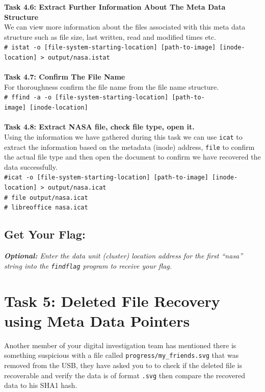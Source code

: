 \documentclass[a4paper,11pt]{article}
\begin{document}
{\noindent
\textbf{Task 4.6: Extract Further Information About The Meta Data Structure}\\
We can view more information about the files associated with this meta data structure such as file size, last written, read and modified times etc.\\

\texttt{{\#} istat -o [file-system-starting-location] [path-to-image] [inode-location] > output/nasa.istat }\\
\\
}
{\noindent
\textbf{Task 4.7: Confirm The File Name}\\
For thoroughness confirm the file name from the file name structure.\\
\texttt{{\#} ffind -a -o [file-system-starting-location] [path-to-\\image] [inode-location] } \\
\\
}
{\noindent
\textbf{Task 4.8: Extract NASA file, check file type, open it.}\\
Using the information we have gathered during this task we can use \texttt{icat} to extract the information based on the metadata (inode) address, \texttt{file} to confirm the actual file type and then open the document to confirm we have recovered the data successfully.\\
\texttt{{\#}icat -o [file-system-starting-location]  [path-to-image] [inode-location] > output/nasa.icat }\\
\noindent
\verb|# file output/nasa.icat|\\
\noindent
\verb|# libreoffice nasa.icat|
}
\subsection*{Get Your Flag:}
\noindent
\textit{\textbf{Optional:} Enter the \textit{data unit} (cluster) location address for the first ``nasa'' string into the \texttt{findflag} program to receive your flag.}

\section{Task 5: Deleted File Recovery using Meta Data Pointers}
Another member of your digital investigation team has mentioned there is something suspicious with a file called \texttt{progress/my\_friends.svg} that was removed from the USB, they have asked you to to check if the deleted file is recoverable and verify the data is of format \texttt{.svg} then compare the recovered data to his SHA1 hash.\\
\end{document}
